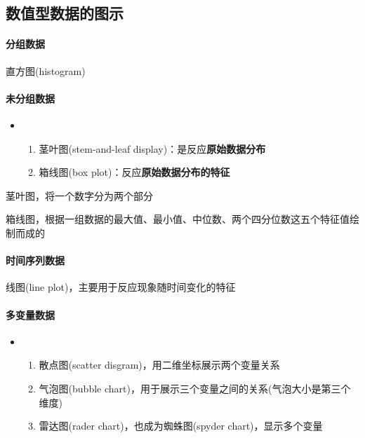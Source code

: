 \documentclass[UTF8,10pt]{book}
\begin{document}
    \subsection{数值型数据的图示}
            \paragraph{分组数据} 直方图(histogram)
            \paragraph{未分组数据} 
                \begin{itemize}
                    \item [] {
                        \begin{enumerate}
                            \item 茎叶图(stem-and-leaf display)：是反应\textbf{原始数据分布}
                            \item 箱线图(box plot)：反应\textbf{原始数据分布的特征}
                        \end{enumerate}
                    }
                \end{itemize}

                茎叶图，将一个数字分为两个部分

                箱线图，根据一组数据的最大值、最小值、中位数、两个四分位数这五个特征值绘制而成的
            
            \paragraph{时间序列数据} 线图(line plot)，主要用于反应现象随时间变化的特征
            \paragraph{多变量数据}
                \begin{itemize}
                    \item [] {
                        \begin{enumerate}
                            \item 散点图(scatter disgram)，用二维坐标展示两个变量关系
                            \item 气泡图(bubble chart)，用于展示三个变量之间的关系(气泡大小是第三个维度)
                            \item 雷达图(rader chart)，也成为蜘蛛图(spyder chart)，显示多个变量
                        \end{enumerate}
                    }
                \end{itemize}
\end{document}
